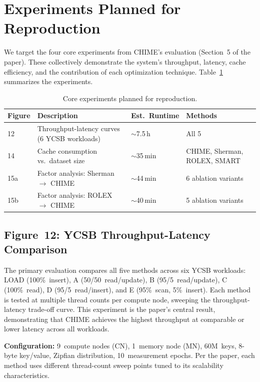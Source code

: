 \documentclass[11pt,a4paper]{article}
\begin{document}
\section{Experiments Planned for Reproduction}
\label{sec:experiments}

We target the four core experiments from CHIME's evaluation (Section~5 of the paper). These collectively demonstrate the system's throughput, latency, cache efficiency, and the contribution of each optimization technique. Table~\ref{tab:experiments} summarizes the experiments.

\begin{table}[H]
\centering
\caption{Core experiments planned for reproduction.}
\label{tab:experiments}
\begin{tabular}{@{}llll@{}}
\toprule
\textbf{Figure} & \textbf{Description} & \textbf{Est.\ Runtime} & \textbf{Methods} \\
\midrule
12 & Throughput-latency curves (6 YCSB workloads) & $\sim$7.5\,h & All 5 \\
14 & Cache consumption vs.\ dataset size & $\sim$35\,min & CHIME, Sherman, ROLEX, SMART \\
15a & Factor analysis: Sherman $\to$ CHIME & $\sim$44\,min & 6 ablation variants \\
15b & Factor analysis: ROLEX $\to$ CHIME & $\sim$40\,min & 5 ablation variants \\
\bottomrule
\end{tabular}
\end{table}

\subsection{Figure~12: YCSB Throughput-Latency Comparison}

The primary evaluation compares all five methods across six YCSB workloads: LOAD (100\%~insert), A (50/50~read/update), B (95/5~read/update), C (100\%~read), D (95/5~read/insert), and E (95\%~scan, 5\%~insert). Each method is tested at multiple thread counts per compute node, sweeping the throughput-latency trade-off curve. This experiment is the paper's central result, demonstrating that CHIME achieves the highest throughput at comparable or lower latency across all workloads.

\textbf{Configuration:} 9~compute nodes (CN), 1~memory node (MN), 60M~keys, 8-byte key/value, Zipfian distribution, 10~measurement epochs. Per the paper, each method uses different thread-count sweep points tuned to its scalability characteristics.
\end{document}
